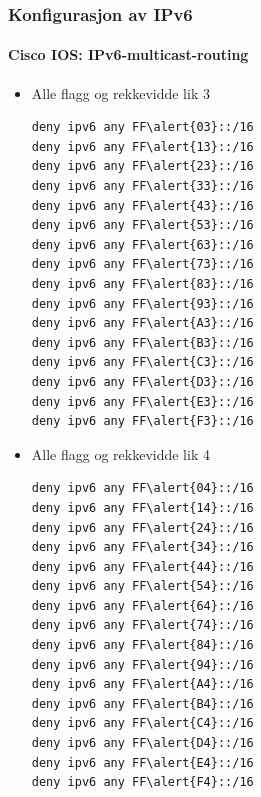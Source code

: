 \begin{frame}[fragile]%
  \frametitle{Konfigurasjon av IPv6}
  \framesubtitle{Cisco IOS: IPv6-multicast-routing}
  \begin{multicols}{2}
    \begin{itemize}%
    \item Alle flagg og rekkevidde lik 3
\begin{Verbatim}[commandchars=\\\{\},fontsize=\scriptsize]
deny ipv6 any FF\alert{03}::/16
deny ipv6 any FF\alert{13}::/16
deny ipv6 any FF\alert{23}::/16
deny ipv6 any FF\alert{33}::/16
deny ipv6 any FF\alert{43}::/16
deny ipv6 any FF\alert{53}::/16
deny ipv6 any FF\alert{63}::/16
deny ipv6 any FF\alert{73}::/16
deny ipv6 any FF\alert{83}::/16
deny ipv6 any FF\alert{93}::/16
deny ipv6 any FF\alert{A3}::/16
deny ipv6 any FF\alert{B3}::/16
deny ipv6 any FF\alert{C3}::/16
deny ipv6 any FF\alert{D3}::/16
deny ipv6 any FF\alert{E3}::/16
deny ipv6 any FF\alert{F3}::/16
\end{Verbatim}
    \item Alle flagg og rekkevidde lik 4
\begin{Verbatim}[commandchars=\\\{\},fontsize=\scriptsize]
deny ipv6 any FF\alert{04}::/16
deny ipv6 any FF\alert{14}::/16
deny ipv6 any FF\alert{24}::/16
deny ipv6 any FF\alert{34}::/16
deny ipv6 any FF\alert{44}::/16
deny ipv6 any FF\alert{54}::/16
deny ipv6 any FF\alert{64}::/16
deny ipv6 any FF\alert{74}::/16
deny ipv6 any FF\alert{84}::/16
deny ipv6 any FF\alert{94}::/16
deny ipv6 any FF\alert{A4}::/16
deny ipv6 any FF\alert{B4}::/16
deny ipv6 any FF\alert{C4}::/16
deny ipv6 any FF\alert{D4}::/16
deny ipv6 any FF\alert{E4}::/16
deny ipv6 any FF\alert{F4}::/16
\end{Verbatim}
    \end{itemize}
  \end{multicols}
\end{frame}

